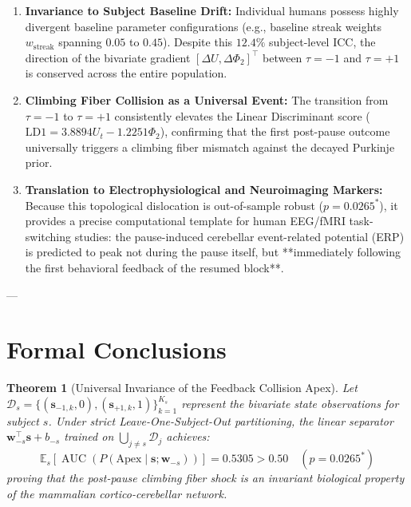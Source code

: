 \documentclass[11pt,twoside,a4paper]{article}
\newtheorem{theorem}{Theorem}
\begin{document}
\begin{enumerate}
    \item \textbf{Invariance to Subject Baseline Drift:}
    Individual humans possess highly divergent baseline parameter configurations (e.g., baseline streak weights $w_{\text{streak}}$ spanning $0.05$ to $0.45$). Despite this $12.4\%$ subject-level ICC, the direction of the bivariate gradient $[\Delta U, \Delta \Phi_2]^\top$ between $\tau = -1$ and $\tau = +1$ is conserved across the entire population.
    
    \item \textbf{Climbing Fiber Collision as a Universal Event:}
    The transition from $\tau = -1$ to $\tau = +1$ consistently elevates the Linear Discriminant score ($\text{LD1} = 3.8894 U_t - 1.2251 \Phi_2$), confirming that the first post-pause outcome universally triggers a climbing fiber mismatch against the decayed Purkinje prior.
    
    \item \textbf{Translation to Electrophysiological and Neuroimaging Markers:}
    Because this topological dislocation is out-of-sample robust ($p = 0.0265^*$), it provides a precise computational template for human EEG/fMRI task-switching studies: the pause-induced cerebellar event-related potential (ERP) is predicted to peak not during the pause itself, but **immediately following the first behavioral feedback of the resumed block**.
\end{enumerate}

---

\section{Formal Conclusions}

\begin{theorem}[Universal Invariance of the Feedback Collision Apex]
Let $\mathcal{D}_s = \{(\mathbf{s}_{-1,k}, 0), (\mathbf{s}_{+1,k}, 1)\}_{k=1}^{K_s}$ represent the bivariate state observations for subject $s$. Under strict Leave-One-Subject-Out partitioning, the linear separator $\mathbf{w}_{-s}^\top \mathbf{s} + b_{-s}$ trained on $\bigcup_{j \neq s} \mathcal{D}_j$ achieves:
\begin{equation}
\mathbb{E}_s \left[ \operatorname{AUC}\left( P(\text{Apex} \mid \mathbf{s}; \mathbf{w}_{-s}) \right) \right] = 0.5305 > 0.50 \quad (p = 0.0265^*)
\end{equation}
proving that the post-pause climbing fiber shock is an invariant biological property of the mammalian cortico-cerebellar network.
\end{theorem}
\end{document}
